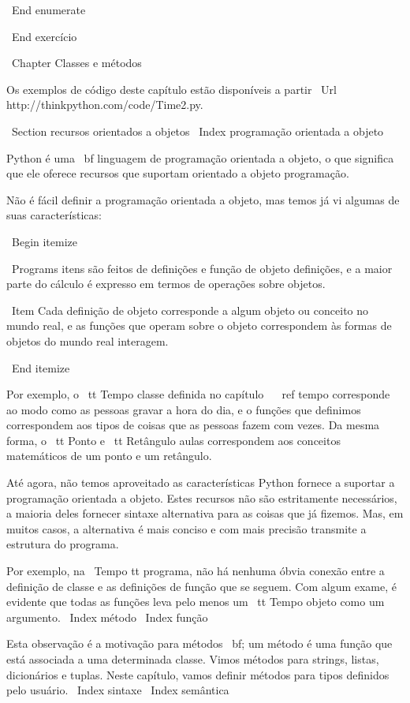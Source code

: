 \documentclass[10pt]{book}
\begin{document}
{{{{{{{{{{{{{{\ End {enumerate}

\ End {} exercício


\ Chapter {Classes e métodos}

Os exemplos de código deste capítulo estão disponíveis a partir
\ Url {http://thinkpython.com/code/Time2.py}.

\ Section {recursos orientados a objetos}
\ Index {programação orientada a objeto}

Python é uma {\ bf linguagem de programação orientada a objeto}, o que significa
que ele oferece recursos que suportam orientado a objeto
programação.

Não é fácil definir a programação orientada a objeto, mas temos
já vi algumas de suas características:

\ Begin {itemize}

\ Programs itens são feitos de definições e função de objeto
definições, e a maior parte do cálculo é expresso em termos
de operações sobre objetos.

\ Item Cada definição de objeto corresponde a algum objeto ou conceito
no mundo real, e as funções que operam sobre o objeto
correspondem às formas de objetos do mundo real interagem.

\ End {itemize}

Por exemplo, o {\ tt Tempo} classe definida no capítulo ~ \ ref {tempo}
corresponde ao modo como as pessoas gravar a hora do dia, e o
funções que definimos correspondem aos tipos de coisas que as pessoas fazem com
vezes. Da mesma forma, o {\ tt Ponto} e {\ tt Retângulo} aulas
correspondem aos conceitos matemáticos de um ponto e um retângulo.

Até agora, não temos aproveitado as características Python fornece a
suportar a programação orientada a objeto. Estes
recursos não são estritamente necessários, a maioria deles fornecer
sintaxe alternativa para as coisas que já fizemos. Mas, em muitos casos,
a alternativa é mais conciso e com mais precisão transmite a
estrutura do programa.

Por exemplo, na {\ Tempo tt} programa, não há nenhuma óbvia
conexão entre a definição de classe e as definições de função
que se seguem. Com algum exame, é evidente que todas as funções
leva pelo menos um {\ tt Tempo} objeto como um argumento.
\ Index {método}
\ Index {função}

Esta observação é a motivação para {métodos \ bf}; um método é
uma função que está associada a uma determinada classe.
Vimos métodos para strings, listas, dicionários e tuplas.
Neste capítulo, vamos definir métodos para tipos definidos pelo usuário.
\ Index {} sintaxe
\ Index {} semântica

}}}}}}}}}}}}}}
\end{document}
